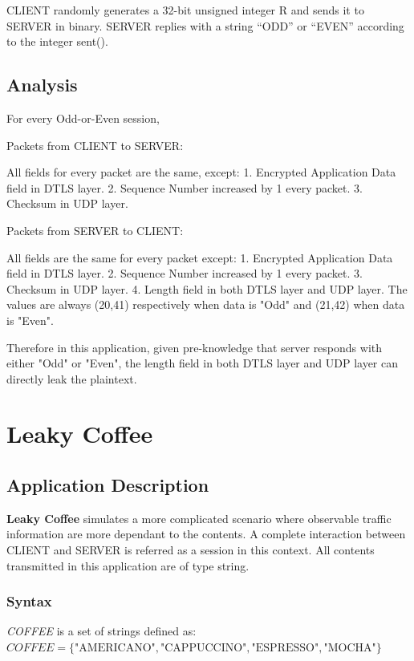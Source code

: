 CLIENT randomly generates a 32-bit unsigned integer R and sends it to SERVER in binary. SERVER replies with a string “ODD'' or “EVEN” according to the integer sent().

\subsection{Analysis}

For every Odd-or-Even session, 

Packets from CLIENT to SERVER:

All fields for every packet are the same, except:
1. Encrypted Application Data field in DTLS layer.
2. Sequence Number increased by 1 every packet.
3. Checksum in UDP layer.

Packets from SERVER to CLIENT:

All fields are the same for every packet except:
1. Encrypted Application Data field in DTLS layer.
2. Sequence Number increased by 1 every packet.
3. Checksum in UDP layer.
4. Length field in both DTLS layer and UDP layer. The values are always (20,41) respectively when data is "Odd" and (21,42) when data is "Even".

Therefore in this application, given pre-knowledge that server responds with either "Odd" or "Even", the length field in both DTLS layer and UDP layer can directly leak the plaintext. 

\section{Leaky Coffee}
\label{Sec: Leaky Coffee}

\subsection{Application Description}
\textbf{Leaky Coffee} simulates a more complicated scenario where observable traffic information are more dependant to the contents. A complete interaction between CLIENT and SERVER is referred as a session in this context. All contents transmitted in this application are of type string.

\subsubsection{Syntax}
\begin{definition}
\textit{COFFEE} is a set of strings defined as:\\
 $COFFEE = \{  {\text{"AMERICANO"}}, \text{"CAPPUCCINO"}, \text{"ESPRESSO"}, \text{"MOCHA"}\}$
\end{definition}

